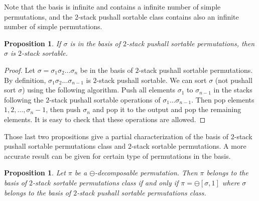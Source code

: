\documentclass[11pt]{article}
\newtheorem{prop}[thm]{Proposition}
\newcommand{\pushall}{$2$-stack pushall sortable\xspace}
\begin{document}
Note that the basis is infinite and contains a infinite number of simple permutations, and the \pushall class contains also an infinite number of simple permutations.

\begin{prop}\label{prop:basePushallTriable}
If $\sigma$ is in the basis of \pushall permutations, then $\sigma$ is $2$-stack sortable.
\end{prop}
\begin{proof}
Let $\sigma = \sigma_1\sigma_2\ldots\sigma_n$ be in the basis of \pushall permutations. 
By definition, $\sigma_1\sigma_2\ldots\sigma_{n-1}$ is \pushall. 
We can sort $\sigma$ (not pushall sort $\sigma$) using the following algorithm. 
Push all elements $\sigma_1$ to $\sigma_{n-1}$ in the stacks following the \pushall operations of $\sigma_1\ldots\sigma_{n-1}$. 
Then pop elements $1, 2, \ldots, \sigma_n-1$, then push $\sigma_n$ and pop it to the output and pop the remaining elements. 
It is easy to check that these operations are allowed.
\end{proof}

Those last two propositions give a partial characterization of the basis of \pushall permutations class and $2$-stack sortable permutations. 
A more accurate result can be given for certain type of permutations in the basis.


\begin{prop}
Let $\pi$ be a $\ominus$-decomposable permutation. 
Then $\pi$ belongs to the basis of $2$-stack sortable permutations class if and only if $\pi = \ominus[\sigma,1]$ where $\sigma$ belongs to the basis of \pushall permutations class.
\end{prop}
\end{document}

